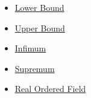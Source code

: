 \begin{dependencies}
\begin{itemize}
  \item \hyperref[def:real-lower-bound]{Lower Bound}
  \item \hyperref[def:real-upper-bound]{Upper Bound}
  \item \hyperref[def:infimum]{Infimum}
  \item \hyperref[def:supremum]{Supremum}
  \item \hyperref[def:real-ordered-field]{Real Ordered Field}
\end{itemize}
\end{dependencies}

\clearpage
